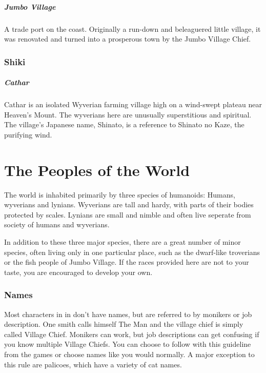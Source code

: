 \paragraph{Jumbo Village} A trade port on the coast. Originally a run-down and beleaguered little village, it was renovated and turned into a prosperous town by the Jumbo Village Chief.

\subsection*{Shiki}
\paragraph{Cathar} Cathar is an isolated Wyverian farming village high on a wind-swept plateau near Heaven's Mount. The wyverians here are unusually superstitious and spiritual.  The village's Japanese name, Shinato, is a reference to Shinato no Kaze, the purifying wind.


\chapter{The Peoples of the World}

The world is inhabited primarily by three species of humanoids: Humans, wyverians and lynians. Wyverians are tall and hardy, with parts of their bodies protected by scales. Lynians are small and nimble and often live seperate from society of humans and wyverians.

In addition to these three major species, there are a great number of minor species, often living only in one particular place, such as the dwarf-like troverians or the fish people of Jumbo Village. If the races provided here are not to your taste, you are encouraged to develop your own.


\subsection*{Names}
Most characters in in \MH{} don't have names, but are referred to by monikers or job description. One smith calls himself The Man and the village chief is simply called Village Chief. Monikers can work, but job descriptions can get confusing if you know multiple Village Chiefs. You can choose to follow with this guideline from the games or choose names like you would normally. A major exception to this rule are palicoes, which have a variety of cat names.

